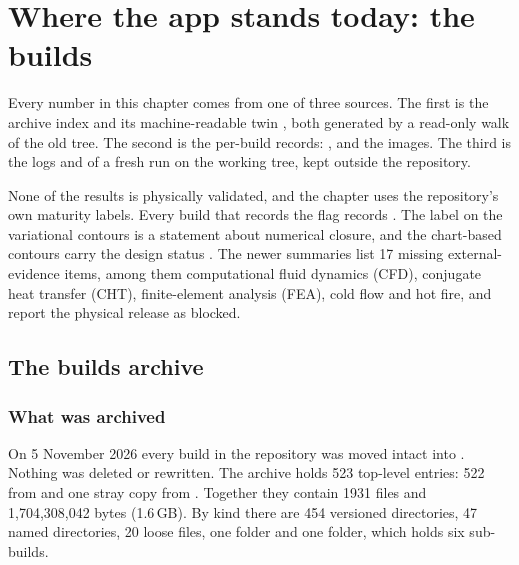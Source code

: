 \chapter{Where the app stands today: the builds}\label{ch:builds}


Every number in this chapter comes from one of three sources. The first is the archive index  and its machine-readable twin , both generated by a read-only walk of the old  tree. The second is the per-build records: ,  and the images. The third is the logs and  of a fresh run on the working tree, kept outside the repository.

None of the results is physically validated, and the chapter uses the repository's own maturity labels. Every build that records the  flag records . The label  on the variational contours is a statement about numerical closure, and the chart-based contours carry the design status . The newer summaries list 17 missing external-evidence items, among them computational fluid dynamics (CFD), conjugate heat transfer (CHT), finite-element analysis (FEA), cold flow and hot fire, and report the physical release as blocked.

\section{The builds archive}\label{sec:builds-archive}

\subsection{What was archived}\label{sec:builds-archive-what}

On 5 November 2026 every build in the repository was moved intact into . Nothing was deleted or rewritten. The archive holds 523 top-level entries: 522 from  and one stray copy from . Together they contain 1931 files and 1,704,308,042 bytes (1.6\,GB). By kind there are 454 versioned  directories, 47 named directories, 20 loose files, one  folder and one  folder, which holds six sub-builds.

